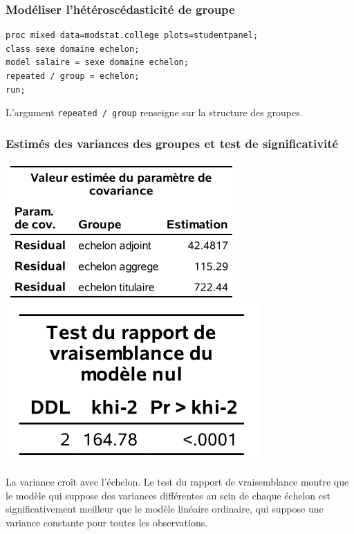 \documentclass{beamer}
\begin{document}
\begin{frame}[fragile]
\frametitle{Modéliser l'hétéroscédasticité de groupe}
\begin{tcolorbox}[colback=white, colframe=hecblue, title=Code \SASlang{} pour spécifier une variance différente pour chaque groupe]
\begin{small}
\begin{verbatim}
proc mixed data=modstat.college plots=studentpanel;
class sexe domaine echelon;
model salaire = sexe domaine echelon;
repeated / group = echelon;
run;
\end{verbatim}
\end{small}
\end{tcolorbox}
L'argument \texttt{repeated / group} renseigne \SASlang{} sur la structure des groupes.
\end{frame}
\begin{frame}
\frametitle{Estimés des variances des groupes et test de significativité}
 \begin{center}
\includegraphics[width = 0.45\linewidth]{img/c5/diapos6-e25}  
\includegraphics[width = 0.38\linewidth]{img/c5/diapos6-e26}  
 \end{center}
La variance croît avec l'échelon. Le test du rapport de vraisemblance montre que le modèle qui suppose des variances différentes au sein de chaque échelon est significativement meilleur que le modèle linéaire ordinaire, qui suppose une variance constante pour toutes les observations.
\end{frame}
\end{document}
